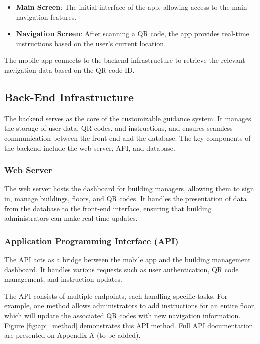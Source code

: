\begin{itemize} 
	\item \textbf{Main Screen}: The initial interface of the app, allowing access to the main navigation features. 
	\item \textbf{Navigation Screen}: After scanning a QR code, the app provides real-time instructions based on the user’s current location.
 \end{itemize}

The mobile app connects to the backend infrastructure to retrieve the relevant navigation data based on the QR code ID.

\subsection{Back-End Infrastructure}

The backend serves as the core of the customizable guidance system. It manages the storage of user data, QR codes, and instructions, and ensures seamless communication between the front-end and the database. The key components of the backend include the web server, API, and database.

\subsubsection{Web Server}

The web server hosts the dashboard for building managers, allowing them to sign in, manage buildings, floors, and QR codes. It handles the presentation of data from the database to the front-end interface, ensuring that building administrators can make real-time updates.

\subsubsection{Application Programming Interface (API)}

The API acts as a bridge between the mobile app and the building management dashboard. It handles various requests such as user authentication, QR code management, and instruction updates.

The API consists of multiple endpoints, each handling specific tasks. For example, one method allows administrators to add instructions for an entire floor, which will update the associated QR codes with new navigation information. Figure \ref{fig:api_method} demonstrates this API method. Full API documentation are presented on Appendix A (to be added). 

